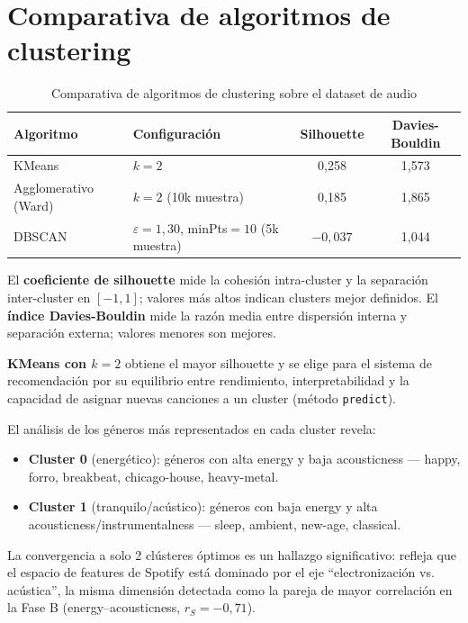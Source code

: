\documentclass[12pt, a4paper, twoside]{book}
\theoremstyle{definition}
\begin{document}
\section{Comparativa de algoritmos de clustering}

\begin{table}[H]
\centering
\caption{Comparativa de algoritmos de clustering sobre el dataset de audio}
\label{tab:clustering}
\begin{tabular}{llcc}
\toprule
\textbf{Algoritmo} & \textbf{Configuración} & \textbf{Silhouette} & \textbf{Davies-Bouldin} \\
\midrule
KMeans            & $k = 2$              & 0{,}258 & 1{,}573 \\
Agglomerativo (Ward) & $k = 2$ (10k muestra) & 0{,}185 & 1{,}865 \\
DBSCAN            & $\varepsilon = 1{,}30$, minPts$=10$ (5k muestra) & $-0{,}037$ & 1{,}044 \\
\bottomrule
\end{tabular}
\end{table}

El \textbf{coeficiente de silhouette} mide la cohesión intra-cluster y la
separación inter-cluster en $[-1, 1]$; valores más altos indican clusters
mejor definidos. El \textbf{índice Davies-Bouldin} mide la razón media entre
dispersión interna y separación externa; valores menores son mejores.

\textbf{KMeans con $k = 2$} obtiene el mayor silhouette y se elige para el
sistema de recomendación por su equilibrio entre rendimiento, interpretabilidad
y la capacidad de asignar nuevas canciones a un cluster (método \texttt{predict}).

El análisis de los géneros más representados en cada cluster revela:
\begin{itemize}
  \item \textbf{Cluster 0} (energético): géneros con alta energy y baja
        acousticness --- happy, forro, breakbeat, chicago-house, heavy-metal.
  \item \textbf{Cluster 1} (tranquilo/acústico): géneros con baja energy y
        alta acousticness/instrumentalness --- sleep, ambient, new-age, classical.
\end{itemize}

La convergencia a solo 2 clústeres óptimos es un hallazgo significativo: refleja
que el espacio de features de Spotify está dominado por el eje
``electronización vs. acústica'', la misma dimensión detectada como la pareja de
mayor correlación en la Fase B (energy--acousticness, $r_S = -0{,}71$).
\end{document}
